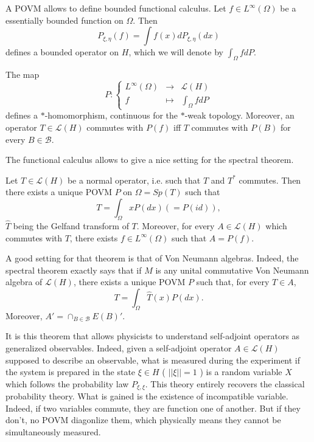 A POVM allows to define bounded functional calculus. Let $f\in L^\infty(\Omega)$ be a essentially bounded function on $\Omega$. Then 
\[P_{\xi,\eta}(f) = \int f(x) dP_{\xi,\eta}(dx)\]
defines a bounded operator on $H$, which we will denote by $\int_\Omega f dP$.

\begin{prop}
The map 
\[P : \left\{\begin{array}{rcl}
L^\infty(\Omega) & \rightarrow & \mathcal L(H) \\
f & \mapsto & \int_\Omega f dP
\end{array}\right.\]
defines a $*$-homomorphism, continuous for the $*$-weak topology. Moreover, an operator $T\in\mathcal L(H)$ commutes with $P(f)$ iff $T$ commutes with $P(B)$ for every $B\in\mathcal B$.
\end{prop}

The functional calculus allows to give a nice setting for the spectral theorem.

\begin{thm} Let $T\in \mathcal L(H)$ be a normal operator, i.e. such that $T$ and $T^*$ commutes. Then there exists a unique POVM $P$ on $\Omega = Sp(T)$ such that 
\[T = \int_\Omega x P(dx) (=P(id)),\]
$\hat T$ being the Gelfand transform of $T$. Moreover, for every $A\in \mathcal L(H)$ which commutes with $T$, there exists $f\in L^\infty (\Omega)$ such that $A= P(f)$.
\end{thm}

\begin{rk} A good setting for that theorem is that of Von Neumann algebras. Indeed, the spectral theorem exactly says that if $M$ is any unital commutative Von Neumann algebra of $\mathcal L(H)$, there exists a unique POVM $P$ such that, for every $T\in A$,
\[T = \int_\Omega \hat T(x) P(dx).\]
Moreover,  $A' = \cap_{B\in\mathcal B} E(B)'$.
\end{rk}

It is this theorem that allows physicists to understand self-adjoint operators as generalized observables. Indeed, given a self-adjoint operator $A\in\mathcal L(H)$ supposed to describe an observable, what is measured during the experiment if the system is prepared in the state $\xi\in H$ ( $||\xi||= 1$ ) is a random variable $X$ which follows the probability law $P_{\xi,\xi}$. This theory entirely recovers the classical probability theory. What is gained is the existence of incompatible variable. Indeed, if two variables commute, they are function one of another. But if they don't, no POVM diagonlize them, which physically means they cannot be simultaneously measured.  

